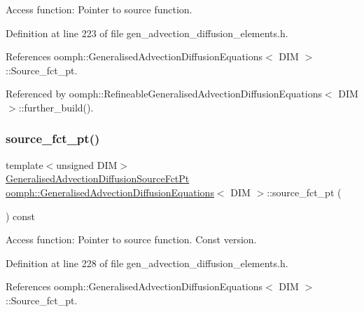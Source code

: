 Access function\+: Pointer to source function. 



Definition at line 223 of file gen\+\_\+advection\+\_\+diffusion\+\_\+elements.\+h.



References oomph\+::\+Generalised\+Advection\+Diffusion\+Equations$<$ D\+I\+M $>$\+::\+Source\+\_\+fct\+\_\+pt.



Referenced by oomph\+::\+Refineable\+Generalised\+Advection\+Diffusion\+Equations$<$ D\+I\+M $>$\+::further\+\_\+build().

\mbox{\label{classoomph_1_1GeneralisedAdvectionDiffusionEquations_ad6c539f5291e125e41ead1323c4f89bd}} 
\subsubsection{\texorpdfstring{source\+\_\+fct\+\_\+pt()}{source\_fct\_pt()}\hspace{0.1cm}{\footnotesize\ttfamily [2/2]}}
{\footnotesize\ttfamily template$<$unsigned D\+IM$>$ \\
\hyperlink{classoomph_1_1GeneralisedAdvectionDiffusionEquations_ad65d34bc0348f8b297c185d1772eafd9}{Generalised\+Advection\+Diffusion\+Source\+Fct\+Pt} \hyperlink{classoomph_1_1GeneralisedAdvectionDiffusionEquations}{oomph\+::\+Generalised\+Advection\+Diffusion\+Equations}$<$ D\+IM $>$\+::source\+\_\+fct\+\_\+pt (\begin{DoxyParamCaption}{ }\end{DoxyParamCaption}) const\hspace{0.3cm}{\ttfamily [inline]}}



Access function\+: Pointer to source function. Const version. 



Definition at line 228 of file gen\+\_\+advection\+\_\+diffusion\+\_\+elements.\+h.



References oomph\+::\+Generalised\+Advection\+Diffusion\+Equations$<$ D\+I\+M $>$\+::\+Source\+\_\+fct\+\_\+pt.

